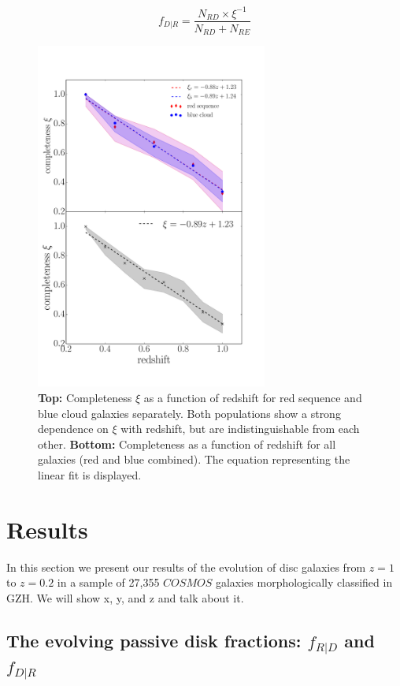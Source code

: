 \documentclass[useAMS,usenatbib]{mn2e}
\begin{document}
\begin{equation}
f_{D|R}=\frac{N_{RD}\times \xi^{-1}}{N_{RD} + N_{RE}}
\label{eqn:frid}
\end{equation}


\begin{figure}
\centering
\includegraphics[width=3in,trim={0cm 2cm 2cm 1cm},clip]{figures/completenessmoneyplot.pdf}
\caption{\textbf{Top:} Completeness $\xi$ as a function of redshift for red sequence and blue cloud  galaxies separately. Both populations show a strong dependence on $\xi$ with redshift, but are indistinguishable from each other. \textbf{Bottom:} Completeness as a function of redshift for all   galaxies (red and blue combined). The equation representing the linear fit is displayed.}
\label{fig:xi}
\end{figure}

\section{Results}
\label{sec:results}
In this section we present our results of the evolution of disc galaxies from $z=1$ to $z=0.2$ in a sample of 27,355 $COSMOS$ galaxies morphologically classified in GZH. We will show x, y, and z and talk about it. 

\subsection{The evolving passive disk fractions: $f_{R|D}$ and $f_{D|R}$} 
\end{document}
